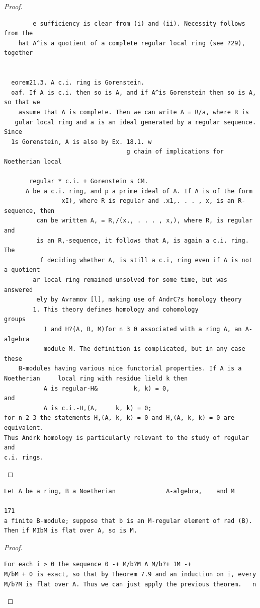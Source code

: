 \begin{proof}
\begin{verbatim}
        e sufficiency is clear from (i) and (ii). Necessity follows from the
    hat A^is a quotient of a complete regular local ring (see ?29), together


  eorem21.3. A c.i. ring is Gorenstein.
  oaf. If A is c.i. then so is A, and if A^is Gorenstein then so is A, so that we
    assume that A is complete. Then we can write A = R/a, where R is
   gular local ring and a is an ideal generated by a regular sequence. Since
  1s Gorenstein, A is also by Ex. 18.1. w
                                  g chain of implications for Noetherian local

       regular * c.i. + Gorenstein s CM.
      A be a c.i. ring, and p a prime ideal of A. If A is of the form
                xI), where R is regular and .x1,. . . , x, is an R-sequence, then
         can be written A, = R,/(x,, . . . , x,), where R, is regular and
         is an R,-sequence, it follows that A, is again a c.i. ring. The
          f deciding whether A, is still a c.i, ring even if A is not a quotient
        ar local ring remained unsolved for some time, but was answered
         ely by Avramov [l], making use of AndrC?s homology theory
        1. This theory defines homology and cohomology                     groups
           ) and H?(A, B, M)for n 3 0 associated with a ring A, an A-algebra
           module M. The definition is complicated, but in any case these
    B-modules having various nice functorial properties. If A is a
Noetherian     local ring with residue lield k then
           A is regular-H&          k, k) = 0,
and
           A is c.i.-H,(A,     k, k) = 0;
for n 2 3 the statements H,(A, k, k) = 0 and H,(A, k, k) = 0 are equivalent.
Thus Andrk homology is particularly relevant to the study of regular and
c.i. rings.
\end{verbatim}
\end{proof}


\begin{theorem}\label{mcrt-auto-theorem-22-2}\uses{}
\begin{verbatim}
Let A be a ring, B a Noetherian              A-algebra,    and M
                                                                              171
a finite B-module; suppose that b is an M-regular element of rad (B).
Then if MIbM is flat over A, so is M.
\end{verbatim}
\end{theorem}
\begin{proof}
\begin{verbatim}
For each i > 0 the sequence 0 -+ M/b?M A M/b?+ 1M -+
M/bM + 0 is exact, so that by Theorem 7.9 and an induction on i, every
M/b?M is flat over A. Thus we can just apply the previous theorem.   n
\end{verbatim}
\end{proof}


